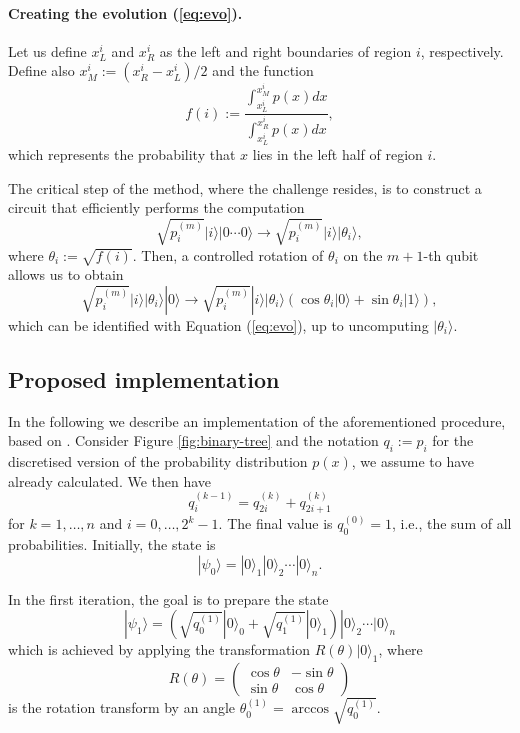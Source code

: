 \documentclass[a4paper, 10pt]{article}
\numberwithin{equation}{section}
\numberwithin{figure}{section}
\numberwithin{table}{section}
\begin{document}
\paragraph{Creating the evolution (\ref{eq:evo}).}
Let us define $x^i_L$ and $x^i_R$ as the left and right boundaries of region $i$, respectively. Define also $x^i_M:=(x^i_R-x^i_L)/2$ and the function
\begin{equation}
	f(i):=\dfrac{\int_{x^i_L}^{x^i_M}p(x)dx}{\int_{x^i_L}^{x^i_R}p(x)dx},
\end{equation}
which represents the probability that $x$ lies in the left half of region $i$.

The critical step of the method, where the challenge resides, is to construct a circuit that efficiently performs the computation
\begin{equation}
	\sqrt{p_i^{(m)}}|i\rangle|0\cdots 0\rangle \rightarrow 	\sqrt{p_i^{(m)}}|i\rangle|\theta_i\rangle,
\end{equation}
where $\theta_i:=\sqrt{f(i)}$. Then, a controlled rotation of $\theta_i$ on the $m+1$-th qubit allows us to obtain
\begin{equation}
	\sqrt{p_i^{(m)}}|i\rangle|\theta_i\rangle|0\rangle \rightarrow \sqrt{p_i^{(m)}}|i\rangle|\theta_i\rangle(\cos\theta_i|0\rangle + \sin\theta_i|1\rangle),
\end{equation}
which can be identified with Equation (\ref{eq:evo}), up to uncomputing $|\theta_i\rangle$.

\subsection{Proposed implementation}

In the following we describe an implementation of the aforementioned procedure, based on \cite{chiang}. Consider Figure \ref{fig:binary-tree} and the notation $q_i:=p_i$ for the discretised version of the probability distribution $p(x)$, we assume to have already calculated. We then have
\begin{equation}
	q_i^{(k-1)} = q_{2i}^{(k)} + q_{2i+1}^{(k)}
\end{equation}
for $k=1,\dots,n$ and $i=0,\dots,2^{k}-1$. The final value is $q_0^{(0)}=1$, i.e., the sum of all probabilities. Initially, the state is
$$
|\psi_0\rangle = |0\rangle_1 |0\rangle_2 \cdots |0\rangle_n.
$$

In the first iteration, the goal is to prepare the state
$$
|\psi_1\rangle = \left(\sqrt{q_0^{(1)}}|0\rangle_0 + \sqrt{q_1^{(1)}}|0\rangle_1\right)|0\rangle_2 \cdots |0\rangle_n
$$
which is achieved by applying the transformation $R(\theta)|0\rangle_1$, where
$$
R(\theta) = \begin{pmatrix}
\cos\theta & -\sin\theta \\
\sin\theta & \cos\theta
\end{pmatrix}
$$
is the rotation transform by an angle $\theta_0^{(1)}=\arccos\sqrt{q_0^{(1)}}$.
\end{document}
